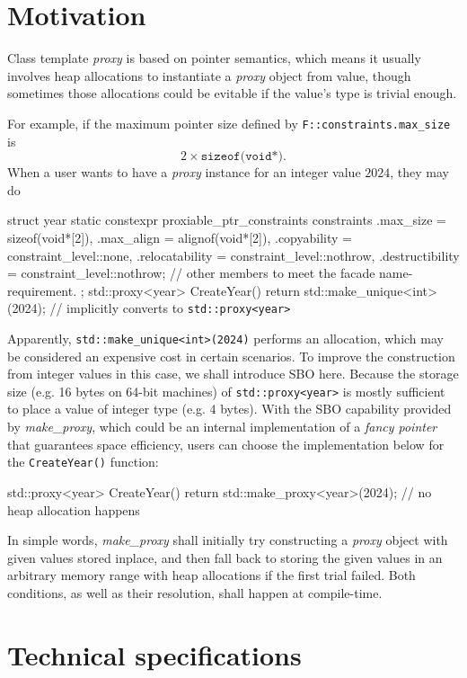 \documentclass[10pt, a4paper, oneside]{article}
\begin{document}
\section{Motivation}
Class template \textit{proxy} is based on pointer semantics,
which means it usually involves heap allocations to instantiate a \textit{proxy} object from value,
though sometimes those allocations could be evitable if the value's type is trivial enough.

For example, if the maximum pointer size defined by \verb|F::constraints.max_size| is
\begin{equation*}
2 \times \texttt{sizeof(void*)}.
\end{equation*}
When a user wants to have a \textit{proxy} instance for an integer value $2024$, they may do
\begin{codeblock}
struct year {
  static constexpr proxiable_ptr_constraints constraints{
    .max_size = sizeof(void*[2]),
    .max_align = alignof(void*[2]),
    .copyability = constraint_level::none,
    .relocatability = constraint_level::nothrow,
    .destructibility = constraint_level::nothrow};
  // other members to meet the facade name-requirement.
};
std::proxy<year> CreateYear() {
  return std::make_unique<int>(2024);  // implicitly converts to \verb|std::proxy<year>|
}
\end{codeblock}
Apparently, \verb|std::make_unique<int>(2024)| performs an allocation,
which may be considered an expensive cost in certain scenarios.
To improve the construction from integer values in this case,
we shall introduce SBO here.
Because the storage size (e.g. 16 bytes on 64-bit machines) of \verb|std::proxy<year>| is mostly sufficient to place a value of integer type (e.g. 4 bytes).
With the SBO capability provided by \textit{make\_proxy}, which could be an internal implementation of a \textit{fancy pointer} that guarantees space efficiency,
users can choose the implementation below for the \verb|CreateYear()| function:
\begin{codeblock}
std::proxy<year> CreateYear() {
  return std::make_proxy<year>(2024);  // no heap allocation happens
}
\end{codeblock}
In simple words,
\textit{make\_proxy} shall initially try constructing a \textit{proxy} object with given values stored inplace,
and then fall back to storing the given values in an arbitrary memory range with heap allocations if the first trial failed.
Both conditions, as well as their resolution, shall happen at compile-time.

\section{Technical specifications}
\end{document}
